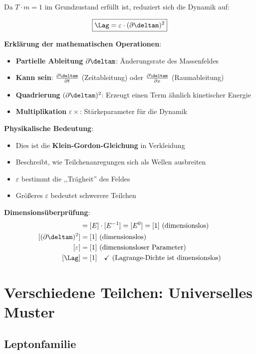 	Da $T \cdot m = 1$ im Grundzustand erfüllt ist, reduziert sich die Dynamik auf:
	
	\begin{equation}
		\boxed{\Lag = \varepsilon \cdot (\partial \deltam)^2}
		\label{eq:particle_lagrangian}
	\end{equation}
	
	\textbf{Erklärung der mathematischen Operationen}:
	\begin{itemize}
		\item \textbf{Partielle Ableitung} $\partial \deltam$: Änderungsrate des Massenfeldes
		\item \textbf{Kann sein}: $\frac{\partial \deltam}{\partial t}$ (Zeitableitung) oder $\frac{\partial \deltam}{\partial x}$ (Raumableitung)
		\item \textbf{Quadrierung} $(\partial \deltam)^2$: Erzeugt einen Term ähnlich kinetischer Energie
		\item \textbf{Multiplikation} $\varepsilon \times$: Stärkeparameter für die Dynamik
	\end{itemize}
	
	\textbf{Physikalische Bedeutung}:
	\begin{itemize}
		\item Dies ist die \textbf{Klein-Gordon-Gleichung} in Verkleidung
		\item Beschreibt, wie Teilchenanregungen sich als Wellen ausbreiten
		\item $\varepsilon$ bestimmt die ,,Trägheit'' des Feldes
		\item Größeres $\varepsilon$ bedeutet schwerere Teilchen
	\end{itemize}
	
	\textbf{Dimensionsüberprüfung}:
	\begin{align}
		[\partial \deltam] &= [E] \cdot [E^{-1}] = [E^0] = [1] \text{ (dimensionslos)} \\
		[(\partial \deltam)^2] &= [1] \text{ (dimensionslos)} \\
		[\varepsilon] &= [1] \text{ (dimensionsloser Parameter)} \\
		[\Lag] &= [1] \quad \checkmark \text{ (Lagrange-Dichte ist dimensionslos)}
	\end{align}
	
	\section{Verschiedene Teilchen: Universelles Muster}
	
	\subsection{Leptonfamilie}
	

